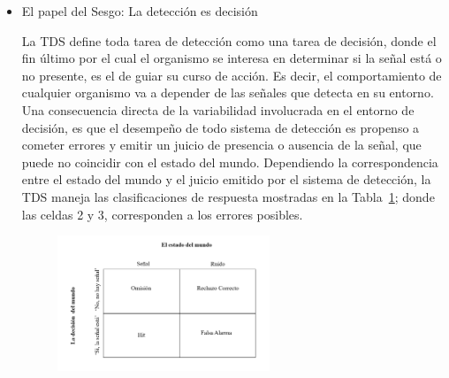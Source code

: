 \begin{itemize}
\begin{itemize}
El soporte de las distribuciones, identificado en la Figura 1 bajo el nombre de ‘Evidencia’ rara vez se define con precisión,  teniendo una concepción más bien abstracta; La idea general es que cuando queremos detectar una señal particular, comenzamos a recolectar un tipo de evidencia específico a la tarea ante la que nos encontramos. Lo más importante, es que la señal siempre va a estar asociada en mayor medida con dicha evidencia, distribuyéndose siempre en valores situados por encima (a la derecha, en la Figura 1) del ruido.\\


     \end{itemize}
 
  \item{El papel del Sesgo: La detección es decisión}

La TDS define toda tarea de detección como una tarea de decisión, donde el fin último por el cual el organismo se interesa en determinar si la señal está o no presente, es el de guiar su curso de acción. Es decir, el comportamiento de cualquier organismo va a depender de las señales que detecta en su entorno.\\

Una consecuencia directa de la variabilidad involucrada en el entorno de decisión, es que el desempeño de todo sistema de detección es propenso a cometer errores y emitir un juicio de presencia o ausencia de la señal, que puede no coincidir con el estado del mundo. Dependiendo la correspondencia entre el estado del mundo y el juicio emitido por el sistema de detección, la TDS maneja las clasificaciones de respuesta mostradas en la Tabla~\ref{fig:Mat_Output}; donde las celdas 2 y 3, corresponden a los errores posibles.\\

\begin{figure}[th]
\centering
\includegraphics[width=0.60\textwidth]{Figures/Matriz_Outputs} 
\caption[Posibles Resultados a obtener en una Tarea de Detección]{}
\label{fig:Mat_Output}
\end{figure}


\end{itemize}
